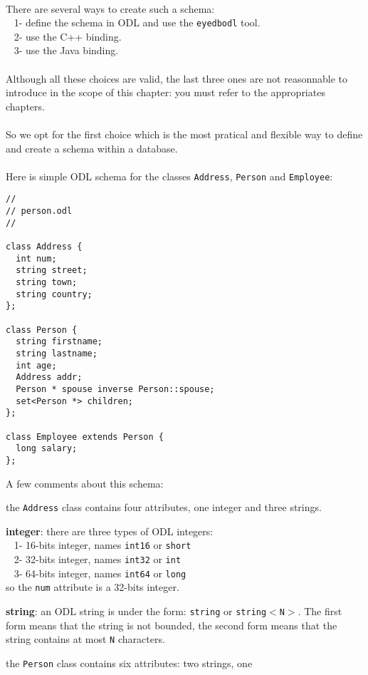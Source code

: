 \\
There are several ways to create such a schema:\\
\mbox{ } 1- define the schema in ODL and use the \texttt{eyedbodl} tool. \\
\mbox{ } 2- use the C++ binding. \\
\mbox{ } 3- use the Java binding. \\
\\
Although all these choices are valid, the last three ones are
not reasonnable to introduce in the scope of this chapter: you must refer
to the appropriates chapters.
\\
\\
So we opt for the first choice which is the most pratical
and flexible way to define and create a schema within a database.
\\
\\
Here is simple ODL schema for the classes \texttt{Address}, \texttt{Person} 
and \texttt{Employee}:
\verbsize \begin{verbatim}
//
// person.odl
//

class Address {
  int num;
  string street;
  string town;
  string country;
};

class Person {
  string firstname;
  string lastname;
  int age;
  Address addr;
  Person * spouse inverse Person::spouse;
  set<Person *> children;
};

class Employee extends Person {
  long salary;
};
\end{verbatim}
\normalsize
A few comments about this schema:
\bi
\item the \texttt{Address} class contains four attributes, one integer
and three strings.
\bi
\item {\bf integer}: there are three types of ODL integers: \\
\mbox{ } 1- 16-bits integer, names \texttt{int16} or \texttt{short} \\
\mbox{ } 2- 32-bits integer, names \texttt{int32} or \texttt{int} \\
\mbox{ } 3- 64-bits integer, names \texttt{int64} or \texttt{long} \\
so the \texttt{num} attribute is a 32-bits integer.
\item {\bf string}: an ODL string is under the form: \texttt{string} or
\texttt{string$<$N$>$}. The
first form means that the string is not bounded, the second form means
that the string contains at most \texttt{N} characters.
\ei
\item the \texttt{Person} class contains six attributes: two strings, one
